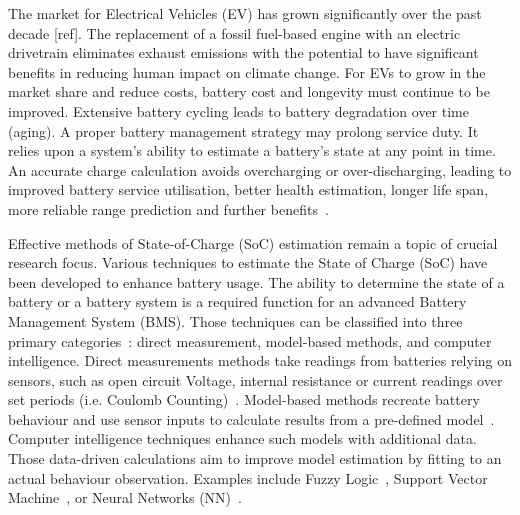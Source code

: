 The market for Electrical Vehicles (EV) has grown significantly over the past decade [ref].
The replacement of a fossil fuel-based engine with an electric drivetrain eliminates exhaust emissions with the potential to have significant benefits in reducing human impact on climate change.
For EVs to grow in the market share and reduce costs, battery cost and longevity must continue to be improved.
Extensive battery cycling leads to battery degradation over time (aging).
A proper battery management strategy may prolong service duty.
It relies upon a system's ability to estimate a battery's state at any point in time.
An accurate charge calculation avoids overcharging or over-discharging, leading to improved battery service utilisation, better health estimation, longer life span, more reliable range prediction and further benefits~\cite{calif_proper_2008}.

%
%
Effective methods of State-of-Charge (SoC) estimation remain a topic of crucial research focus.
Various techniques to estimate the State of Charge (SoC) have been developed to enhance battery usage.
The ability to determine the state of a battery or a battery system is a required function for an advanced Battery Management System (BMS).
Those techniques can be classified into three primary categories~\cite{ali_towards_2019,ng_enhanced_2009,robust_SoC,6953745}: direct measurement, model-based methods, and computer intelligence.
Direct measurements methods take readings from batteries relying on sensors, such as open circuit Voltage, internal resistance or current readings over set periods (i.e. Coulomb Counting)~\cite{ng_enhanced_2009,robust_SoC}.
Model-based methods recreate battery behaviour and use sensor inputs to calculate results from a pre-defined model~\cite{6953745}.
Computer intelligence techniques enhance such models with additional data.
Those data-driven calculations aim to improve model estimation by fitting to an actual behaviour observation.
Examples include Fuzzy Logic~\cite{malkhandi_fuzzy_2006}, Support Vector Machine~\cite{hansen_support_2005, anton_battery_2013}, or Neural Networks (NN)~\cite{song_lithium-ion_2018,Chemali2017,mamo_long_2020,jiao_gru-rnn_2020,xiao_accurate_2019,javid_adaptive_2020,zhang_deep_2020}.

